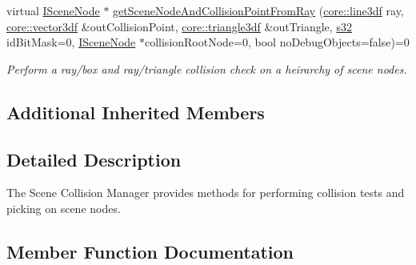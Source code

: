 \begin{DoxyCompactItemize}
virtual \hyperlink{classirr_1_1scene_1_1ISceneNode}{I\+Scene\+Node} $\ast$ \hyperlink{classirr_1_1scene_1_1ISceneCollisionManager_a25af822d52bce9acd88adfc7ce484982}{get\+Scene\+Node\+And\+Collision\+Point\+From\+Ray} (\hyperlink{namespaceirr_1_1core_acadb288f9aca3bf2d1222abcdf77114e}{core\+::line3df} ray, \hyperlink{namespaceirr_1_1core_ae6e2b2a6c552833ebbd5b7463d03586b}{core\+::vector3df} \&out\+Collision\+Point, \hyperlink{namespaceirr_1_1core_a8983bda2678a7a67d97bf3c7be6c31c7}{core\+::triangle3df} \&out\+Triangle, \hyperlink{namespaceirr_ac66849b7a6ed16e30ebede579f9b47c6}{s32} id\+Bit\+Mask=0, \hyperlink{classirr_1_1scene_1_1ISceneNode}{I\+Scene\+Node} $\ast$collision\+Root\+Node=0, bool no\+Debug\+Objects=false)=0
\begin{DoxyCompactList}\small\item\em Perform a ray/box and ray/triangle collision check on a heirarchy of scene nodes. \end{DoxyCompactList}\end{DoxyCompactItemize}
\subsection*{Additional Inherited Members}


\subsection{Detailed Description}
The Scene Collision Manager provides methods for performing collision tests and picking on scene nodes. 

\subsection{Member Function Documentation}
\mbox{\label{classirr_1_1scene_1_1ISceneCollisionManager_a0adcf9dca228fac89b085144141f33b0}} 

